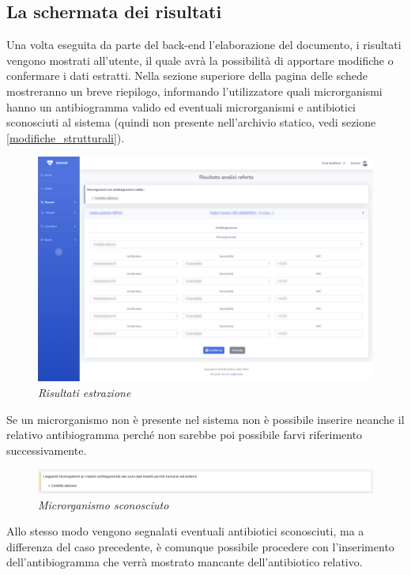 \subsection{La schermata dei risultati}
Una volta eseguita da parte del back-end l'elaborazione del documento, i risultati vengono mostrati all'utente, il quale avrà la possibilità di apportare modifiche o confermare i dati estratti.
Nella sezione superiore della pagina delle schede mostreranno un breve riepilogo, informando l'utilizzatore quali microrganismi hanno un antibiogramma valido ed eventuali microrganismi e antibiotici sconosciuti al sistema (quindi non presente nell'archivio statico, vedi sezione \ref{modifiche_strutturali}).
\begin{figure}[h!]
	\centering
	\includegraphics[width=.99\columnwidth]{images/extraction_result.png}
	\caption{\textit{Risultati estrazione}}
	\label{fig:extraction_result}
\end{figure}
\newline
Se un microrganismo non è presente nel sistema non è possibile inserire neanche il relativo antibiogramma perché non sarebbe poi possibile farvi riferimento successivamente.
\begin{figure}[h!]
	\centering
	\includegraphics[width=.99\columnwidth]{images/static_missing.png}
	\caption{\textit{Microrganismo sconosciuto}}
	\label{fig:missing_micro}
\end{figure}
\newline
Allo stesso modo vengono segnalati eventuali antibiotici sconosciuti, ma a differenza del caso precedente, è comunque possibile procedere con l'inserimento dell'antibiogramma che verrà mostrato mancante dell'antibiotico relativo.
